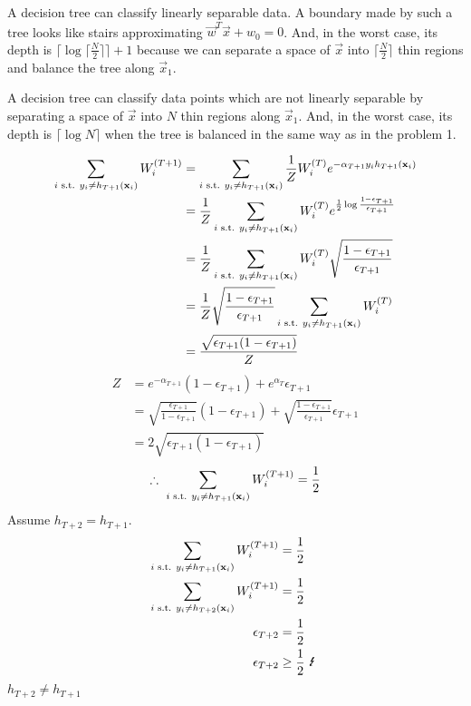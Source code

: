 \documentclass{introtosml}
\newcommand{\x}{\vec{x}}
\newcommand{\w}{\vec{w}}
\newcommand{\sumhi}[1][T+1]{\sum_{i \st y_i \ne h_{#1}(\x_i)}}
\newcommand{\W}[1]{W_i^{(#1)}}
\newcommand{\e}[1]{\epsilon_{#1}}
\newcommand{\ett}{\e{T+1}}
\begin{document}
\maketitle

\begin{p}
  \item
    A decision tree can classify linearly separable data.
    A boundary made by such a tree looks like stairs
    approximating $\w^T \x + w_0 = 0$.
    And, in the worst case, its depth is
    $\lceil \log \lceil \frac{N}{2} \rceil \rceil + 1$
    because we can separate a space of $\x$
    into $\lceil \frac{N}{2} \rceil$ thin regions
    and balance the tree along $\x_1$.

  \item
    A decision tree can classify data points which are not linearly separable
    by separating a space of $\x$ into $N$ thin regions along $\x_1$.
    And, in the worst case, its depth is $\lceil \log N \rceil$
    when the tree is balanced in the same way as in the problem 1.

  \item
    \begin{align*}
      \sumhi \W{T+1}
      & = \sumhi \frac{1}{Z} \W{T} e^{- \alpha_{T+1} y_i h_{T+1}(\x_i)} \\
      & = \frac{1}{Z} \sumhi \W{T} e^{\frac{1}{2} \log \frac{1 - \ett}{\ett}} \\
      & = \frac{1}{Z} \sumhi \W{T} \sqrt{\frac{1 - \ett}{\ett}} \\
      & = \frac{1}{Z} \sqrt{\frac{1 - \ett}{\ett}} \sumhi \W{T} \\
      & = \frac{\sqrt{\ett (1 - \ett)}}{Z}
    \end{align*}
    \begin{align*}
      Z
      & = e^{- \alpha_{T+1}} (1 - \ett) + e^{\alpha_T} \ett \\
      & = \sqrt{\frac{\ett}{1 - \ett}} (1 - \ett)
          + \sqrt{\frac{1 - \ett}{\ett}} \ett \\
      & = 2 \sqrt{\ett (1 - \ett)}
    \end{align*}
    \begin{gather*}
      \therefore \sumhi \W{T+1} = \frac{1}{2}
    \end{gather*}
    Assume $h_{T+2} = h_{T+1}$.
    \begin{align*}
      \sumhi \W{T+1} & = \frac{1}{2} \\
      \sumhi[T+2] \W{T+1} & = \frac{1}{2} \\
      \e{T+2} & = \frac{1}{2} \\
      \e{T+2} & \ge \frac{1}{2} \contradiction
    \end{align*}
    \therefore $h_{T+2} \ne h_{T+1}$


\end{p}
\end{document}
